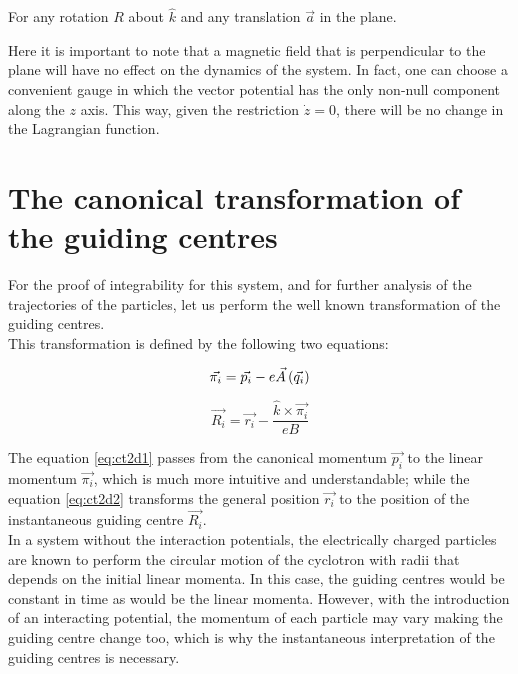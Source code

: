 For any rotation $R$ about $\hat{k}$ and any translation $\vec{a}$ in the plane.

Here it is important to note that a magnetic field that is perpendicular to the plane will have no effect on the dynamics of the system. In fact, one can choose a convenient gauge in which the vector potential has the only non-null component along the $z$ axis. This way, given the restriction $\dot{z} = 0$, there will be no change in the Lagrangian function.\\

\section{The canonical transformation of the guiding centres}

For the proof of integrability for this system, and for further analysis of the trajectories of the particles, let us perform the well known transformation of the guiding centres.\\

This transformation is defined by the following two equations:

\begin{equation}
\vec{\pi_i} = \vec{p_i} - e\vec{A}\left( \vec{q_i} \right)
\label{eq:ct2d1}
\end{equation}

\begin{equation}
\vec{R_i} = \vec{r_i} - \frac{\hat{k}\times\vec{\pi_i}}{eB}
\label{eq:ct2d2}
\end{equation}

The equation \eqref{eq:ct2d1} passes from the canonical momentum $\vec{p_i}$ to the linear momentum $\vec{\pi_i}$, which is much more intuitive and understandable; while the equation \eqref{eq:ct2d2} transforms the general position  $\vec{r_i}$ to the position of the instantaneous guiding centre $\vec{R_i}$.\\

In a system without the interaction potentials, the electrically charged particles are known to perform the circular motion of the cyclotron with radii that depends on the initial linear momenta. In this case, the guiding centres would be constant in time as would be the linear momenta. However, with the introduction of an interacting potential, the momentum of each particle may vary making the guiding centre change too, which is why the instantaneous interpretation of the guiding centres is necessary.\\

